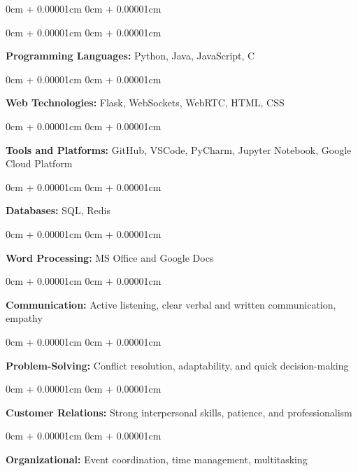 \documentclass[10pt, letterpaper]{article}
\newenvironment{onecolentry}{
    \begin{adjustwidth}{
        0cm + 0.00001cm
    }{
        0cm + 0.00001cm
    }
}{
    \end{adjustwidth}
}
\newenvironment{equaltwocolentry}[2][]{
    \onecolentry
    \def\secondColumn{#2}
    \setcolumnwidth{, \fill}
    \begin{paracol}{2}
}{
    \switchcolumn \raggedleft \secondColumn
    \end{paracol}
    \endonecolentry
}
\begin{document}
    \begin{equaltwocolentry}
    {
        \begin{onecolentry}
        \textbf{Communication:} Active listening, clear verbal and written communication, empathy\\[0.2cm]
        \end{onecolentry}
        \vspace{0.2cm}
        \begin{onecolentry}
        \textbf{Problem-Solving:} Conflict resolution, adaptability, and quick decision-making\\[0.2cm]
        \end{onecolentry}
        \vspace{0.2cm}
        \begin{onecolentry}
        \textbf{Customer Relations:} Strong interpersonal skills, patience, and professionalism\\[0.2cm]
        \end{onecolentry}
        \vspace{0.2cm}
        \begin{onecolentry}
        \textbf{Organizational:} Event coordination, time management, multitasking
        \end{onecolentry}
    }
    
    \begin{onecolentry}
        \textbf{Programming Languages:} Python, Java, JavaScript, C
    \end{onecolentry}
    \vspace{0.4cm}
    \begin{onecolentry}
        \textbf{Web Technologies:} Flask, WebSockets, WebRTC, HTML, CSS
    \end{onecolentry}
    \vspace{0.2cm}
    \begin{onecolentry}
        \textbf{Tools and Platforms:} GitHub, VSCode, PyCharm, Jupyter Notebook, Google Cloud Platform
    \end{onecolentry}
    \vspace{0.4cm}
    \begin{onecolentry}
        \textbf{Databases:} SQL, Redis
    \end{onecolentry}
    \vspace{0.4cm}
    \begin{onecolentry}
        \textbf{Word Processing:} MS Office and Google Docs
    \end{onecolentry}

    \end{equaltwocolentry}
\end{document}
